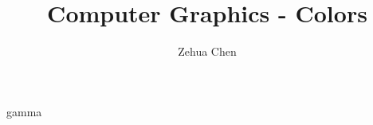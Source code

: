\documentclass[letterpaper, 11pt]{report}
\title{Computer Graphics - Colors}
\author{Zehua Chen}
\begin{document}
  \maketitle
  \tableofcontents

  {gamma}
\end{document}
